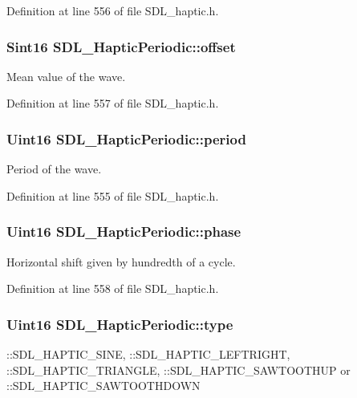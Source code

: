 Definition at line 556 of file S\+D\+L\+\_\+haptic.\+h.

\hypertarget{structSDL__HapticPeriodic_abc7aa9e9c0d546cb54189a7812fbe554}{
\subsubsection[{offset}]{\setlength{\rightskip}{0pt plus 5cm}Sint16 S\+D\+L\+\_\+\+Haptic\+Periodic\+::offset}}\label{structSDL__HapticPeriodic_abc7aa9e9c0d546cb54189a7812fbe554}
Mean value of the wave. 

Definition at line 557 of file S\+D\+L\+\_\+haptic.\+h.

\hypertarget{structSDL__HapticPeriodic_a0e7e105b96308129b248d52b56a2a839}{
\subsubsection[{period}]{\setlength{\rightskip}{0pt plus 5cm}Uint16 S\+D\+L\+\_\+\+Haptic\+Periodic\+::period}}\label{structSDL__HapticPeriodic_a0e7e105b96308129b248d52b56a2a839}
Period of the wave. 

Definition at line 555 of file S\+D\+L\+\_\+haptic.\+h.

\hypertarget{structSDL__HapticPeriodic_a25e8c6aebc78bd74b9343fa228d25d8f}{
\subsubsection[{phase}]{\setlength{\rightskip}{0pt plus 5cm}Uint16 S\+D\+L\+\_\+\+Haptic\+Periodic\+::phase}}\label{structSDL__HapticPeriodic_a25e8c6aebc78bd74b9343fa228d25d8f}
Horizontal shift given by hundredth of a cycle. 

Definition at line 558 of file S\+D\+L\+\_\+haptic.\+h.

\hypertarget{structSDL__HapticPeriodic_ac53c5725e8cff012e9b90e01b7110869}{
\subsubsection[{type}]{\setlength{\rightskip}{0pt plus 5cm}Uint16 S\+D\+L\+\_\+\+Haptic\+Periodic\+::type}}\label{structSDL__HapticPeriodic_ac53c5725e8cff012e9b90e01b7110869}
\+::\+S\+D\+L\+\_\+\+H\+A\+P\+T\+I\+C\+\_\+\+S\+I\+N\+E, \+::\+S\+D\+L\+\_\+\+H\+A\+P\+T\+I\+C\+\_\+\+L\+E\+F\+T\+R\+I\+G\+H\+T, \+::\+S\+D\+L\+\_\+\+H\+A\+P\+T\+I\+C\+\_\+\+T\+R\+I\+A\+N\+G\+L\+E, \+::\+S\+D\+L\+\_\+\+H\+A\+P\+T\+I\+C\+\_\+\+S\+A\+W\+T\+O\+O\+T\+H\+U\+P or \+::\+S\+D\+L\+\_\+\+H\+A\+P\+T\+I\+C\+\_\+\+S\+A\+W\+T\+O\+O\+T\+H\+D\+O\+W\+N 

